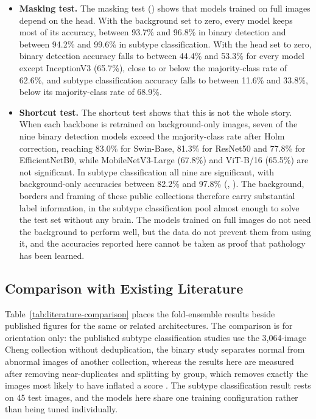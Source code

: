 \documentclass[a4paper,fleqn]{cas-sc}
\begin{document}
\begin{itemize}
\item \textbf{Masking test.} The masking test () shows that models trained on full images depend on the head. With the background set to zero, every model keeps most of its accuracy, between 93.7\% and 96.8\% in binary detection and between 94.2\% and 99.6\% in subtype classification. With the head set to zero, binary detection accuracy falls to between 44.4\% and 53.3\% for every model except InceptionV3 (65.7\%), close to or below the majority-class rate of 62.6\%, and subtype classification accuracy falls to between 11.6\% and 33.8\%, below its majority-class rate of 68.9\%.
\item \textbf{Shortcut test.} The shortcut test shows that this is not the whole story. When each backbone is retrained on background-only images, seven of the nine binary detection models exceed the majority-class rate after Holm correction, reaching 83.0\% for Swin-Base, 81.3\% for ResNet50 and 77.8\% for EfficientNetB0, while MobileNetV3-Large (67.8\%) and ViT-B/16 (65.5\%) are not significant. In subtype classification all nine are significant, with background-only accuracies between 82.2\% and 97.8\% (, ). The background, borders and framing of these public collections therefore carry substantial label information, in the subtype classification pool almost enough to solve the test set without any brain. The models trained on full images do not need the background to perform well, but the data do not prevent them from using it, and the accuracies reported here cannot be taken as proof that pathology has been learned.
\end{itemize}

\subsection{Comparison with Existing Literature}
\label{sec:comparison}

Table~\ref{tab:literature-comparison} places the fold-ensemble results beside published figures for the same or related architectures. The comparison is for orientation only: the published subtype classification studies use the 3,064-image Cheng collection without deduplication, the binary study separates normal from abnormal images of another collection, whereas the results here are measured after removing near-duplicates and splitting by group, which removes exactly the images most likely to have inflated a score \citep{kapoor2023,roberts2021}. The subtype classification result rests on 45 test images, and the models here share one training configuration rather than being tuned individually.
\end{document}
